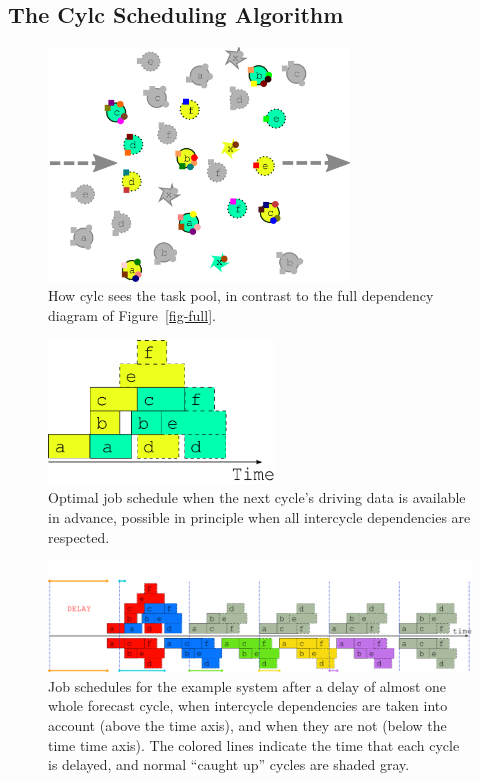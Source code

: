 \documentclass[11pt,a4paper]{article}
\begin{document}
\subsection{The Cylc Scheduling Algorithm} 
\label{TheCylcSchedulingAlgorithm}

\begin{figure} \label{fig-time-two}
    \begin{center} 
        \includegraphics[width=8cm]{inkscape-svg/task-pool}
    \end{center} 
    \caption{\small How cylc sees the task pool, in contrast to the 
    full dependency diagram of Figure~\ref{fig-full}.} 
\end{figure} 

\begin{figure} \label{fig-optimal-two}
    \begin{center}
        \includegraphics[width=6cm]{inkscape-svg/timeline-two-cycles-optimal} 
    \end{center}
    \caption{\small Optimal job schedule when the next cycle's driving
    data is available in advance, possible in principle when all
    intercycle dependencies are respected.} 
\end{figure} 

\begin{figure} \label{fig-time-three}
    \begin{center}
        \includegraphics[width=12cm]{inkscape-svg/timeline-three} 
    \end{center}
    \caption{\small Job schedules for the example system after a delay
    of almost one whole forecast cycle, when intercycle dependencies are
    taken into account (above the time axis), and when they are not
    (below the time time axis). The colored lines indicate the time that
    each cycle is delayed, and normal ``caught up'' cycles
    are shaded gray.} 
\end{figure} 
\end{document}
